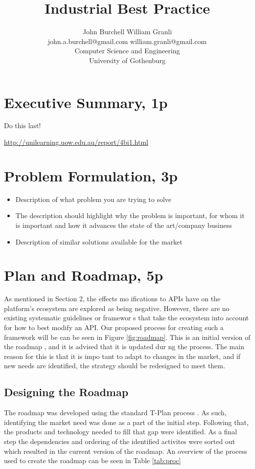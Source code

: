 \documentclass{article}
\title{Industrial Best Practice}
\begin{document}
\author{John Burchell \qquad William Granli \\
		john.a.burchell@gmail.com \qquad william.granli@gmail.com \\
		Computer Science and Engineering  \\
		University of Gothenburg }



\maketitle
\section{Executive Summary, 1p}
Do this last! 

\url{http://unilearning.uow.edu.au/report/4bi1.html}

\section{Problem Formulation, 3p}

\begin{itemize}
	\item Description of what problem you are trying to solve
	\item The description should highlight why the problem is important, for whom it is important and how it advances the state of the art/company business
	\item Description of similar solutions available for the market
\end{itemize}



\section{Plan and Roadmap, 5p}
As mentioned in Section 2, the effects mo ifications to APIs have on the platform’s ecosystem are explored as being negative. However, there are no existing systematic guidelines or framewor s that take the ecosystem into account for how to best modify an API. Our proposed process for creating such a framework will be can be seen in Figure \ref{fig:roadmap}. This is an initial version of the roadmap \cite{!!!roadmap}, and it is advised that it is updated dur ng the process. The main reason for this is that it is impo tant to adapt to changes in the market, and if new needs are identified, the strategy should be redesigned to meet them. 

\subsection{Designing the Roadmap}
The roadmap was developed using the standard T-Plan process \cite{!!!roadmap}. As such, identifying the market need was done as a part of the initial step. Following that, the products and technology needed to fill that gap were identified. As a final step the dependencies and ordering of the identified activites were sorted out which resulted in the current version of the roadmap. An overview of the process used to create the roadmap can be seen in Table \ref{tab:proc}
\end{document}
